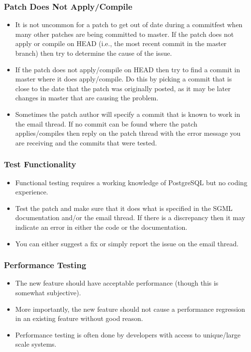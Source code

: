 \begin{frame}
    \frametitle{Patch Does Not Apply/Compile}

    \begin{itemize}
        \item It is not uncommon for a patch to get out of date during a commitfest when many other patches are being committed to master.  If the patch does not apply or compile on HEAD (i.e., the most recent commit in the master branch) then try to determine the cause of the issue.\pause

        \item If the patch does not apply/compile on HEAD then try to find a commit in master where it does apply/compile.  Do this by picking a commit that is close to the date that the patch was originally posted, as it may be later changes in master that are causing the problem.\pause

        \item Sometimes the patch author will specify a commit that is known to work in the email thread.  If no commit can be found where the patch applies/compiles then reply on the patch thread with the error message you are receiving and the commits that were tested.
    \end{itemize}
\end{frame}

\begin{frame}
    \frametitle{Test Functionality}

    \begin{itemize}
        \item Functional testing requires a working knowledge of PostgreSQL but no coding experience.\pause

        \item Test the patch and make sure that it does what is specified in the SGML documentation and/or the email thread.  If there is a discrepancy then it may indicate an error in either the code or the documentation.\pause

        \item You can either suggest a fix or simply report the issue on the email thread.
    \end{itemize}
\end{frame}

\begin{frame}
    \frametitle{Performance Testing}

    \begin{itemize}
        \item The new feature should have acceptable performance (though this is somewhat subjective).\pause

        \item More importantly, the new feature should not cause a performance regression in an existing feature without good reason.\pause

        \item Performance testing is often done by developers with access to unique/large scale systems.
    \end{itemize}
\end{frame}

